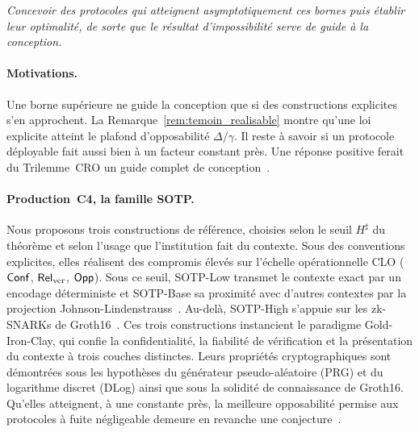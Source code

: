 \begin{sloppypar}
\begin{objectif}\label{obj:obj4_saturation}
\textit{Concevoir des protocoles qui atteignent asymptotiquement ces bornes puis \'etablir leur optimalit\'e, de sorte que le r\'esultat d'impossibilit\'e serve de guide \`a la conception.}
\end{objectif}

\paragraph{Motivations.}
Une borne sup\'erieure ne guide la conception que si des constructions explicites s'en approchent.
La Remarque~\ref{rem:temoin_realisable} montre qu'une loi explicite atteint le plafond d'opposabilit\'e
$\Delta/\gamma$. Il reste \`a savoir si un protocole d\'eployable fait aussi bien \`a un facteur constant pr\`es.
Une r\'eponse positive ferait du Trilemme~CRO un guide complet de conception~\cite{Gennaro13,Parno13,BCTV14}.

\paragraph{Production~C4, la famille SOTP.}
Nous proposons trois constructions de r\'ef\'erence, choisies selon le seuil $H^\sharp$
du th\'eor\`eme et selon l'usage que l'institution fait du contexte. Sous des conventions explicites, elles r\'ealisent
des compromis \'elev\'es sur l'\'echelle op\'erationnelle CLO
($\mathsf{Conf}$, $\mathsf{Rel}_{\mathrm{ver}}$, $\mathsf{Opp}$). Sous ce seuil, SOTP-Low transmet le contexte exact par un encodage d\'eterministe et
SOTP-Base sa proximit\'e avec d'autres contextes par la projection
Johnson-Lindenstrauss~\cite{JohnsonLindenstrauss84,DasguptaGupta03,Vempala05}.
Au-del\`a, SOTP-High s'appuie sur les zk-SNARKs de
Groth16~\cite{Groth16,BenSasson2019,PLONK20}. Ces trois constructions instancient le paradigme Gold-Iron-Clay, qui confie la confidentialit\'e, la fiabilit\'e de v\'erification et la pr\'esentation du contexte \`a trois couches distinctes. Leurs propri\'et\'es
cryptographiques sont d\'emontr\'ees sous les hypoth\`eses du g\'en\'erateur pseudo-al\'eatoire (PRG) et du logarithme discret (DLog) ainsi que sous la solidit\'e de connaissance de Groth16.
Qu'elles atteignent, \`a une constante pr\`es, la meilleure opposabilit\'e permise aux protocoles
\`a fuite n\'egligeable demeure en revanche une conjecture~\cite{Campanelli2019,Wahby18}.


\end{sloppypar}
